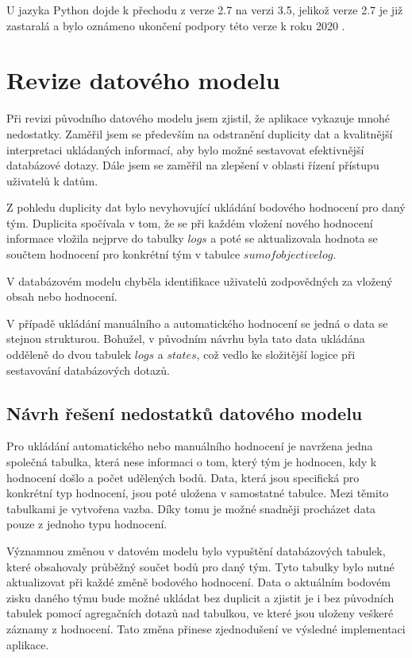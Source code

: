 \documentclass[
  digital, %
  twoside, %
  table,   %
  lof,     %
  lot,     %
]{fithesis3}
\begin{document}
U jazyka Python dojde k přechodu z verze 2.7 na verzi 3.5, jelikož verze 2.7 je již zastaralá a bylo oznámeno ukončení podpory této verze k roku 2020 \cite{python27}.


\section{Revize datového modelu}

Při revizi původního datového modelu jsem zjistil, že aplikace vykazuje mnohé nedostatky. Zaměřil jsem se především na odstranění duplicity dat a kvalitnější interpretaci ukládaných informací, aby bylo možné sestavovat efektivnější databázové dotazy. Dále jsem se zaměřil na zlepšení v oblasti řízení přístupu uživatelů k datům.

Z pohledu duplicity dat bylo nevyhovující ukládání bodového hodnocení pro daný tým. Duplicita spočívala v tom, že se při každém vložení nového hodnocení informace vložila nejprve do tabulky $logs$ a poté se aktualizovala hodnota se součtem hodnocení pro konkrétní tým v tabulce $sumofobjectivelog$.

V databázovém modelu chyběla identifikace uživatelů zodpovědných za vložený obsah nebo hodnocení. 

V případě ukládání manuálního a automatického hodnocení se jedná o data se stejnou strukturou. Bohužel, v původním návrhu byla tato data ukládána odděleně do dvou tabulek $logs$ a $states$, což vedlo ke složitější logice při sestavování databázových dotazů.

\subsection{Návrh řešení nedostatků datového modelu}
Pro ukládání automatického nebo manuálního hodnocení je navržena jedna společná tabulka, která nese informaci o tom, který tým je hodnocen, kdy k hodnocení došlo a počet udělených bodů. Data, která jsou specifická pro konkrétní typ hodnocení, jsou poté uložena v samostatné tabulce. Mezi těmito tabulkami je vytvořena vazba. Díky tomu je možné snadněji procházet data pouze z jednoho typu hodnocení.

Významnou změnou v datovém modelu bylo vypuštění databázových tabulek, které obsahovaly průběžný součet bodů pro daný tým. Tyto tabulky bylo nutné aktualizovat při každé změně bodového hodnocení. Data o aktuálním bodovém zisku daného týmu bude možné ukládat bez duplicit a zjistit je i bez původních tabulek pomocí agregačních dotazů nad tabulkou, ve které jsou uloženy veškeré záznamy z hodnocení. Tato změna přinese zjednodušení ve výsledné implementaci aplikace.
\end{document}

